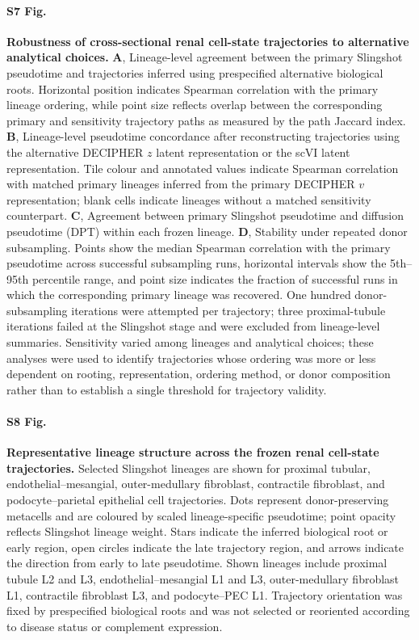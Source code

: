 \documentclass[10pt,letterpaper]{article}
\begin{document}
\paragraph*{S7 Fig.}
\label{S7_Fig}
\textbf{Robustness of cross-sectional renal cell-state trajectories to alternative analytical choices.}
\textbf{A}, Lineage-level agreement between the primary Slingshot pseudotime and trajectories inferred using prespecified alternative biological roots. Horizontal position indicates Spearman correlation with the primary lineage ordering, while point size reflects overlap between the corresponding primary and sensitivity trajectory paths as measured by the path Jaccard index. \textbf{B}, Lineage-level pseudotime concordance after reconstructing trajectories using the alternative DECIPHER $z$ latent representation or the scVI latent representation. Tile colour and annotated values indicate Spearman correlation with matched primary lineages inferred from the primary DECIPHER $v$ representation; blank cells indicate lineages without a matched sensitivity counterpart. \textbf{C}, Agreement between primary Slingshot pseudotime and diffusion pseudotime (DPT) within each frozen lineage. \textbf{D}, Stability under repeated donor subsampling. Points show the median Spearman correlation with the primary pseudotime across successful subsampling runs, horizontal intervals show the 5th--95th percentile range, and point size indicates the fraction of successful runs in which the corresponding primary lineage was recovered. One hundred donor-subsampling iterations were attempted per trajectory; three proximal-tubule iterations failed at the Slingshot stage and were excluded from lineage-level summaries. Sensitivity varied among lineages and analytical choices; these analyses were used to identify trajectories whose ordering was more or less dependent on rooting, representation, ordering method, or donor composition rather than to establish a single threshold for trajectory validity.

\paragraph*{S8 Fig.}
\label{S8_Fig}
\textbf{Representative lineage structure across the frozen renal cell-state trajectories.}
Selected Slingshot lineages are shown for proximal tubular, endothelial--mesangial, outer-medullary fibroblast, contractile fibroblast, and podocyte--parietal epithelial cell trajectories. Dots represent donor-preserving metacells and are coloured by scaled lineage-specific pseudotime; point opacity reflects Slingshot lineage weight. Stars indicate the inferred biological root or early region, open circles indicate the late trajectory region, and arrows indicate the direction from early to late pseudotime. Shown lineages include proximal tubule L2 and L3, endothelial--mesangial L1 and L3, outer-medullary fibroblast L1, contractile fibroblast L3, and podocyte--PEC L1. Trajectory orientation was fixed by prespecified biological roots and was not selected or reoriented according to disease status or complement expression.
\end{document}
